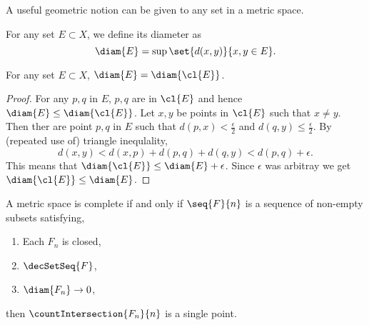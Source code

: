 A useful geometric notion can be given to any set in a metric space.
\begin{Definition}[name=Diameter]
    For any set $E \subset X$, we define its diameter as
    \[\diam{E} = \sup\set{d(x,y)}{x,y\in E}.\]
\end{Definition}
\begin{Proposition}
    For any set $E \subset X$, $\diam{E} = \diam{\cl{E}}$.
\end{Proposition}
\begin{proof}
    For any $p,q$ in $E$, $p,q$ are in $\cl{E}$ and hence $\diam{E} \leq \diam{\cl{E}}$. Let $x,y$ be points
    in $\cl{E}$ such that $x \neq y$. Then ther are point $p,q$ in $E$ such that $d(p,x) < \frac{\epsilon}{2}$
    and $d(q,y) \leq \frac{\epsilon}{2}$. By (repeated use of) triangle inequlality,
    \[d(x,y) < d(x,p) + d(p,q) + d(q,y) < d(p,q) + \epsilon.\]
    This means that
    $\diam{\cl{E}} \leq \diam{E} + \epsilon$. Since $\epsilon$ was arbitray we get $\diam{\cl{E}} \leq \diam{E}$.
\end{proof}
\begin{Theorem}[name=Cantor Intersection theorem]
    A metric space is complete if and only if $\seq{F}{n}$ is a sequence of non-empty subsets satisfying,
    \begin{enumerate}
	\item
	    Each $F_n$ is closed,
	\item
	    $\decSetSeq{F}$,
	\item
	    $\diam{F_n}\to 0$,
    \end{enumerate}
    then $\countIntersection{F_n}{n}$ is a single point.
\end{Theorem}
